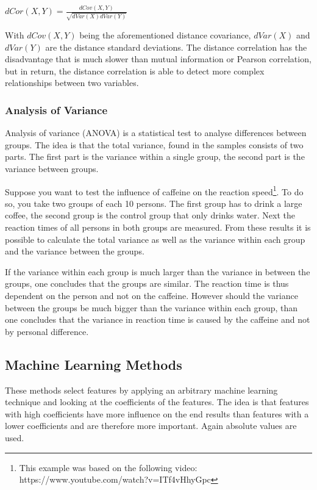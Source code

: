\begin{center}
$dCor(X,Y) = \frac{dCov(X,Y)}{\sqrt{dVar(X)dVar(Y)}}$
\end{center}
With $dCov(X,Y)$ being the aforementioned distance covariance, $dVar(X)$ and $dVar(Y)$ are the distance standard deviations. The distance correlation has the disadvantage that is much slower than mutual information or Pearson correlation, but in return, the distance correlation is able to detect more complex relationships between two variables.

\subsubsection{Analysis of Variance}

Analysis of variance (ANOVA) is a statistical test to analyse differences between groups. The idea is that the total variance, found in the samples consists of two parts. The first part is the variance within a single group, the second part is the variance between groups. 

\npar

Suppose you want to test the influence of caffeine on the reaction speed\footnote{This example was based on the following video: https://www.youtube.com/watch?v=ITf4vHhyGpc}. To do so, you take two groups of each 10 persons. The first group has to drink a large coffee, the second group is the control group that only drinks water. Next the reaction times of all persons in both groups are measured. From these results it is possible to calculate the total variance as well as the variance within each group and the variance between the groups. 

\npar

If the variance within each group is much larger than the variance in between the groups, one concludes that the groups are similar. The reaction time is thus dependent on the person and not on the caffeine. However should the variance between the groups be much bigger than the variance within each group, than one concludes that the variance in reaction time is caused by the caffeine and not by personal difference.

\subsection{Machine Learning Methods}
These methods select features by applying an arbitrary machine learning technique and looking at the coefficients of the features. The idea is that features with high coefficients have more influence on the end results than features with a lower coefficients and are therefore more important. Again absolute values are used.

